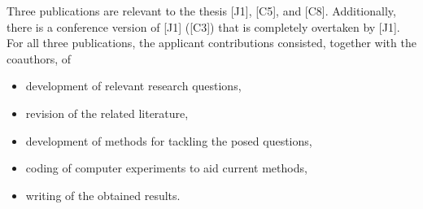 
Three publications are relevant to the thesis [J1], [C5], and [C8].
Additionally, there is a conference version of [J1] ([C3]) that is completely overtaken by [J1].
For all three publications, the applicant contributions consisted, together with the coauthors, of
  \begin{itemize}
    \item development of relevant research questions,
    \item revision of the related literature,
    \item development of methods for tackling the posed questions,
    \item coding of computer experiments to aid current methods,
    \item writing of the obtained results. 
  \end{itemize}